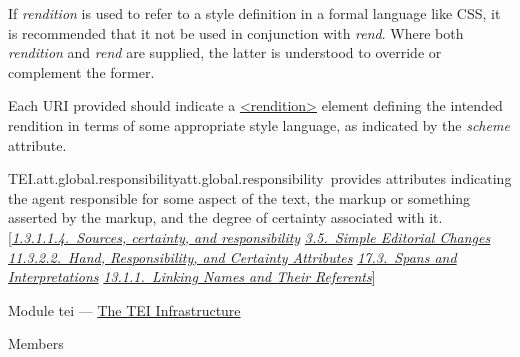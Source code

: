 \begin{reflist}
\begin{sansreflist}
\begin{reflist}
If {\itshape rendition} is used to refer to a style definition in a formal language like CSS, it is recommended that it not be used in conjunction with {\itshape rend}. Where both {\itshape rendition} and {\itshape rend} are supplied, the latter is understood to override or complement the former.\par
Each URI provided should indicate a \hyperref[TEI.rendition]{<rendition>} element defining the intended rendition in terms of some appropriate style language, as indicated by the {\itshape scheme} attribute.
\end{reflist}  
\end{sansreflist}  
\end{reflist}  
\begin{reflist}
\item[]\begin{specHead}{TEI.att.global.responsibility}{att.global.responsibility} provides attributes indicating the agent responsible for some aspect of the text, the markup or something asserted by the markup, and the degree of certainty associated with it. [\textit{\hyperref[STGAso]{1.3.1.1.4.\ Sources, certainty, and responsibility}} \textit{\hyperref[COED]{3.5.\ Simple Editorial Changes}} \textit{\hyperref[PHHR]{11.3.2.2.\ Hand, Responsibility, and Certainty Attributes}} \textit{\hyperref[AISP]{17.3.\ Spans and Interpretations}} \textit{\hyperref[NDATTSnr]{13.1.1.\ Linking Names and Their Referents}}]\end{specHead} 
    \item[{Module}]
  tei — \hyperref[ST]{The TEI Infrastructure}
    \item[{Members}]

\end{reflist}
